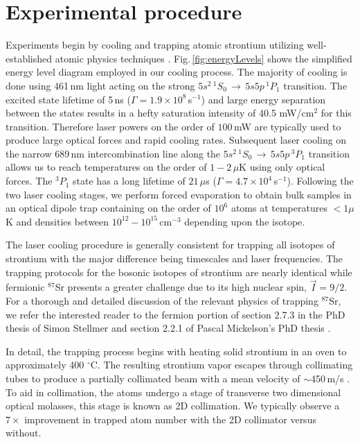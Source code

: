 \section{Experimental procedure} \label{sec:trapping}
\setcounter{footnote}{0}
Experiments begin by cooling and trapping atomic strontium utilizing well-established atomic physics techniques \cite{mvs99,Katori1999,Ido2000,Nagel2003,Mukaiyama2003a,Loftus2004,mmy09a,sth09a,Mickelson2010ja,Tey2010a,dym10,stg10}.
Fig.\,\ref{fig:energyLevels} shows the simplified energy level diagram employed in our cooling process.
The majority of cooling is done using 461\,nm light acting on the strong $5s^2\,^1S_0\,\rightarrow\,5s5p\,^1P_1$ transition.
The excited state lifetime of 5\,ns ($\Gamma=1.9 \times 10^8$\,s$^{-1}$) and large energy separation between the states results in a hefty saturation intensity of 40.5 mW/cm$^2$ for this transition.
Therefore laser powers on the order of $100\,$mW are typically used to produce large optical forces and rapid cooling rates.
Subsequent laser cooling on the narrow 689\,nm intercombination line along the $5s^2\,^1S_0\,\rightarrow\,5s5p\,^3P_1$ transition allows us to reach temperatures on the order of $1-2\,\mu$K using only optical forces.
The $^3P_1$ state has a long lifetime of $21\,\mu$s ($\Gamma=4.7 \times 10^4$\,s$^{-1}$).
Following the two laser cooling stages, we perform forced evaporation to obtain bulk samples in an optical dipole trap containing on the order of $10^6$ atoms at temperatures $<1\mu$K and densities between $10^{12} - 10^{15}\,$cm$^{-3}$ depending upon the isotope. 

The laser cooling procedure is generally consistent for trapping all isotopes of strontium with the major difference being timescales and laser frequencies.
The trapping protocols for the bosonic isotopes of strontium are nearly identical while fermionic $^{87}$Sr presents a greater challenge due to its high nuclear spin, $\vec{I}=9/2$.
For a thorough and detailed discussion of the relevant physics of trapping $^{87}$Sr, we refer the interested reader to the fermion portion of section 2.7.3 in the PhD thesis of Simon Stellmer \cite{SimonStellmer2013} and section 2.2.1 of Pascal Mickelson's PhD thesis \cite{Mickelson2010b}.

In detail, the trapping process begins with heating solid strontium in an oven to approximately 400 $^{\circ}$C. 
The resulting strontium vapor escapes through collimating tubes to produce a partially collimated beam with a mean velocity of $\sim$450\,m/s \cite{Mazurenko2010}.
To aid in collimation, the atoms undergo a stage of transverse two dimensional optical molasses, this stage is known as 2D collimation.
We typically observe a $7\times$ improvement in trapped atom number with the 2D collimator versus without.

